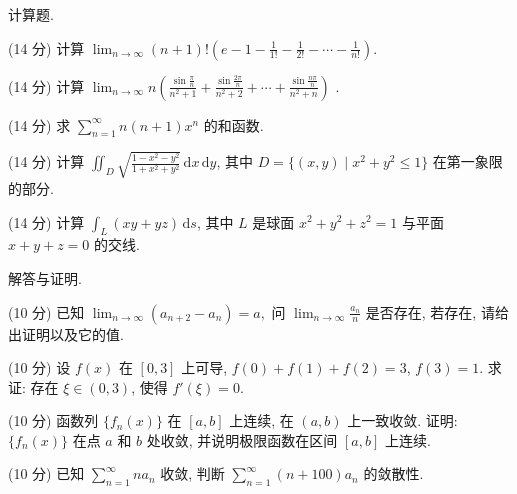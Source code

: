 \par{}
计算题.\par
(14 分) 计算 $\lim_{n\to \infty}(n + 1)! \left(e - 1 - \frac{1}{1!} - \frac{1}{2!} - \cdots - \frac{1}{n!}\right)$.\par
(14 分) 计算  $\lim_{n\to\infty}n\left(\frac{\sin\frac{\pi}{n}}{n^{2}+1}+\frac{\sin\frac{2\pi}{n}}{n^{2}+2}+\cdots+\frac{\sin\frac{n\pi}{n}}{n^{2}+n}\right)$ .\par
(14 分) 求 $\sum_{n=1}^{\infty} n(n+1)x^{n}$ 的和函数.\par
(14 分) 计算 $\iint_{D} \sqrt{\frac{1 - x^2 - y^2}{1 + x^2 + y^2}} \, \mathrm{d}x \, \mathrm{d}y$, 其中 $D = \{(x, y) \mid x^2 + y^2 \leq 1\}$ 在第一象限的部分.\par
(14 分) 计算 $\int_{L} (xy + yz) \, \mathrm{d}s$, 其中 $L$ 是球面 $x^{2} + y^{2} + z^{2} = 1$ 与平面 $x + y + z = 0$ 的交线.\par
\par{}
解答与证明.\par
(10 分) 已知 $\lim_{n\to \infty}(a_{n + 2} - a_n) = a,$ 问 $\lim_{n\to \infty}\frac{a_n}{n}$ 是否存在, 若存在, 请给出证明以及它的值.\par
(10 分) 设 $f(x)$ 在 $[0,3]$ 上可导, $f(0) + f(1) + f(2) = 3$, $f(3) = 1$. 求证: 存在 $\xi \in (0,3)$, 使得 $f'(\xi) = 0$.\par
(10 分) 函数列 $\{f_n(x)\}$ 在 $[a, b]$ 上连续, 在 $(a, b)$ 上一致收敛. 证明: $\{f_n(x)\}$ 在点 $a$ 和 $b$ 处收敛, 并说明极限函数在区间 $[a, b]$ 上连续.\par
(10 分) 已知 $\sum_{n=1}^{\infty} na_n$ 收敛, 判断 $\sum_{n=1}^{\infty} (n+100)a_n$ 的敛散性.\par
